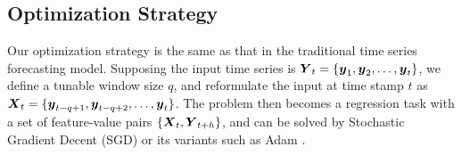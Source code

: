 \subsection{Optimization Strategy}
\label{sec:train}

\iffalse
For a time series sequence, the most straightforward training strategy is to treat the problem as a supervision task with an input time series signals and an output time series signals. Its advantage lies in efficient computation, which allows for going though the neural network part one time at each iteration. But the defect is that we only have one training sample. That being said, we cannot apply stochastic gradient decent (SGD) method. Given the highly non-convex nature of neural network objective function, this strategy can easily lead to bad performance, which is stick at the bad local minimal. 
\fi

Our optimization strategy is the same as that in the traditional time series forecasting model. Supposing the input time series is ${\boldsymbol Y}_t = \{{\boldsymbol y}_1, {\boldsymbol y}_2, \ldots, {\boldsymbol y}_t \}$, we define a tunable window size $q$, and reformulate the input at time stamp $t$ as ${\boldsymbol X}_t = \{{\boldsymbol y}_{t-q+1}, {\boldsymbol y}_{t-q+2}, \ldots, {\boldsymbol y}_t \}$. The problem then becomes a regression task with a set of feature-value pairs $\{{\boldsymbol X}_t, {\boldsymbol Y}_{t+h}\}$, and can be solved by Stochastic Gradient Decent (SGD) or its variants such as Adam \cite{kingma2014adam}.



